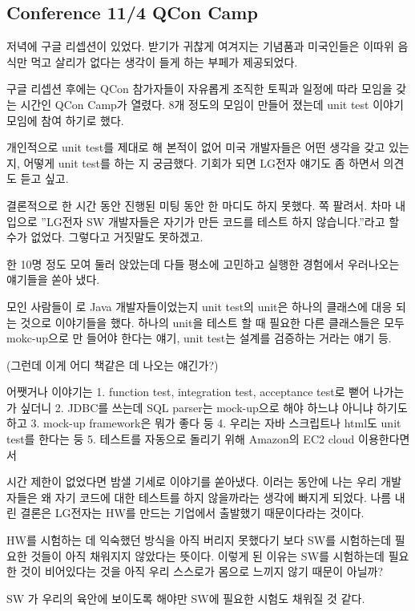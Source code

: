\documentclass[a4paper]{article}
\begin{document}
\subsection{Conference 11/4 QCon Camp}
 
저녁에 구글 리셉션이 있었다. 받기가 귀찮게 여겨지는 기념품과 미국인들은
이따위 음식만 먹고 살리가 없다는 생각이 들게 하는 부페가 제공되었다.
 
구글 리셉션 후에는 QCon 참가자들이 자유롭게 조직한 토픽과 일정에 따라
모임을 갖는 시간인 QCon Camp가 열렸다. 8개 정도의 모임이 만들어 졌는데
unit test 이야기 모임에 참여 하기로 했다.
 
개인적으로 unit test를 제대로 해 본적이 없어 미국 개발자들은 어떤
생각을 갖고 있는지, 어떻게 unit test를 하는 지 궁금했다. 기회가 되면
LG전자 얘기도 좀 하면서 의견도 듣고 싶고.
 
결론적으로 한 시간 동안 진행된 미팅 동안 한 마디도 하지 못했다. 쪽
팔려서. 차마 내 입으로 ”LG전자 SW 개발자들은 자기가 만든 코드를 테스트
하지 않습니다.”라고 할 수가 없었다. 그렇다고 거짓말도 못하겠고.
 
한 10명 정도 모여 둘러 앉았는데 다들 평소에 고민하고 실행한 경험에서 우러나오는 얘기들을 쏟아 냈다. 
 
모인 사람들이 로 Java 개발자들이었는지 unit test의 unit은 하나의
클래스에 대응 되는 것으로 이야기들을 했다. 하나의 unit을 테스트 할 때
필요한 다른 클래스들은 모두 mokc-up으로 만 들어야 한다는 얘기, unit
test는 설계를 검증하는 거라는 얘기 등.
 
(그런데 이게 어디 책같은 데 나오는 얘긴가?)
 
어쨋거나 이야기는 
1. function test, integration test, acceptance test로 뻗어 나가는 가 싶더니 
2. JDBC를 쓰는데 SQL parser는  mock-up으로 해야 하느냐 아니냐 하기도 하고 
3. mock-up framework은 뭐가 좋다 둥 
4. 우리는 자바 스크립트나 html도 unit test를 한다는 둥
5. 테스트를 자동으로 돌리기 위해 Amazon의 EC2 cloud 이용한다면서 
 
시간 제한이 없었다면 밤샐 기세로 이야기를 쏟아냈다. 이러는 동안에 나는 우리 개발자들은 왜 자기 코드에 대한 테스트를 하지 않을까라는 생각에 빠지게 되었다. 나름 내린 결론은 LG전자는 HW를 만드는 기업에서 출발했기 때문이다라는 것이다.
 
HW를 시험하는 데 익숙했던 방식을 아직 버리지 못했다기 보다 SW를 시험하는데 필요한 것들이 아직 채워지지 않았다는 뜻이다. 이렇게 된 이유는 SW를 시험하는데 필요한 것이 비어있다는 것을 아직 우리 스스로가 몸으로 느끼지 않기 때문이 아닐까? 
 
SW 가 우리의 육안에 보이도록 해야만 SW에 필요한 시험도 채워질 것 같다.
 
\end{document}

